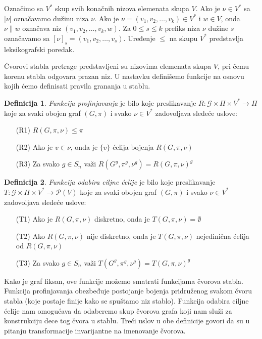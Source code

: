 \documentclass[12pt,oneside]{memoir}
\theoremstyle{definition}
\newtheorem*{definition}{Definicija}
\begin{document}
  Označimo sa $V^*$ skup svih konačnih nizova elemenata skupa $V$. Ako je $\nu
  \in V^*$ sa $|\nu|$ označavamo dužinu niza $\nu$. Ako je $\nu = (v_1, v_2,
  \dots, v_k) \in V^*$ i $w \in V$, onda $\nu \| w$ označava niz $(v_1, v_2,
  \dots, v_k, w)$. Za $0 \leq s \leq k$ prefiks niza $\nu$ dužine $s$ označavamo
  sa $[\nu]_s = (v_1, v_2, \dots, v_s)$. Uređenje $\leq$ na skupu $V^*$
  predstavlja leksikografski poredak.

  Čvorovi stabla pretrage  predstavljeni su nizovima elemenata skupa $V$, pri
  čemu korenu stabla odgovara prazan niz. U nastavku definišemo funkcije na
  osnovu kojih ćemo definisati pravila grananja u stablu.

  \begin{definition}
   \emph{Funkcija profinjavanja} je bilo koje preslikavanje $R : \mathcal{G}
	  \times \Pi \times V^* \to \Pi$ koje za svaki obojen graf $(G, \pi)$ i
	  svako $\nu \in V^*$ zadovoljava sledeće uslove:
  
   \begin{itemize}
       \item[(R1)] $R(G, \pi, \nu) \leq \pi$
       \item[(R2)] Ako je $v \in \nu$, onda je $\{v\}$ ćelija bojenja $R(G,
     	  \pi, \nu)$
       \item[(R3)] Za svako $g \in S_n$ važi $R(G^g, \pi^g, \nu^g) = R(G,
     	 \pi, \nu)^g$
   \end{itemize}
  \end{definition}

  \begin{definition}
   \emph{Funkcija odabira ciljne ćelije} je bilo koje preslikavanje $T :
	  \mathcal{G} \times \Pi \times V^* \to \mathcal{P}(V)$ koje za svaki
	  obojen graf $(G, \pi)$ i svako $\nu \in V^*$ zadovoljava sledeće
	  uslove:
  
   \begin{itemize}
       \item[(T1)] Ako je $R(G, \pi, \nu)$ diskretno, onda je $T(G, \pi, \nu) =
     	  \emptyset$
       \item[(T2)] Ako $R(G, \pi, \nu)$ nije diskretno, onda je $T(G, \pi, \nu)$
     	  nejedinična ćelija od $R(G, \pi, \nu)$
       \item[(T3)] Za svako $g \in S_n$ važi $T(G^g, \pi^g, \nu^g) = T(G, \pi,
     	 \nu)^g$
   \end{itemize}
  \end{definition}

  Kako je graf fiksan, ove funkcije možemo smatrati funkcijama čvorova stabla.
  Funkcija profinjavanja obezbeđuje postojanje bojenja pridruženog svakom čvoru
  stabla (koje postaje finije kako se spuštamo niz stablo). Funkcija odabira
  ciljne ćelije nam omogućava da odaberemo skup čvorova grafa koji nam služi za
  konstrukciju dece tog čvora u stablu. Treći uslov u obe definicije govori da
  su u pitanju transformacije invarijantne na imenovanje čvorova.
\end{document}
